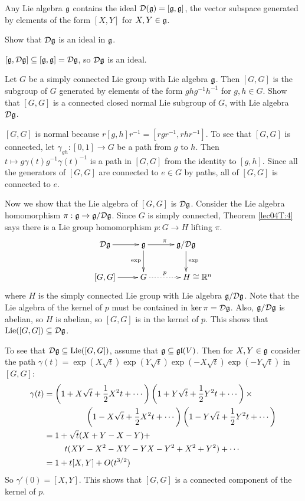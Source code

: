  Any Lie algebra $\mathfrak{g}$ contains the ideal $\mathcal{D}(\mathfrak{g}) = [\mathfrak{g},\mathfrak{g}]$, the vector subspace
 generated by elements of the form $[X,Y]$ for $X,Y\in \mathfrak{g}$.
 \begin{exercise}
   Show that $\mathcal{D}\mathfrak{g}$ is an ideal in $\mathfrak{g}$.
   \begin{solution}
     $[\mathfrak{g},\mathcal{D}\mathfrak{g}]\subseteq [\mathfrak{g},\mathfrak{g}] = \mathcal{D}\mathfrak{g}$, so $\mathcal{D}\mathfrak{g}$ is an ideal.
   \end{solution}
 \end{exercise}
 \begin{exercise} \label{lec11hardEx}
   Let $G$ be a simply connected Lie group with Lie algebra $\mathfrak{g}$. Then $[G,G]$ is the
   subgroup of $G$ generated by elements of the form $ghg^{-1}h^{-1}$ for $g,h\in G$.
   Show that $[G,G]$ is a connected closed normal Lie subgroup of $G$, with Lie
   algebra $\mathcal{D}\mathfrak{g}$.
  \begin{solution}
   $[G,G]$ is normal because $r[g,h]r^{-1}=[rgr^{-1},rhr^{-1}]$. To see
   that $[G,G]$ is connected, let $\gamma_{gh}:[0,1]\to G$ be a path from $g$ to $h$.
   Then $t\mapsto g\gamma(t)g^{-1}\gamma(t)^{-1}$ is a path in $[G,G]$ from
   the identity to $[g,h]$. Since all the generators of $[G,G]$ are connected
   to $e\in G$ by paths, all of $[G,G]$ is connected to $e$.

   Now we show that the Lie algebra of $[G,G]$ is $\mathcal{D}\mathfrak{g}$. Consider the Lie algebra
   homomorphism $\pi:\mathfrak{g}\to \mathfrak{g}/\mathcal{D}\mathfrak{g}$. Since $G$ is simply connected, Theorem
   \ref{lec04T:4} says there is a Lie group homomorphism $p:G\to H$ lifting $\pi$.
   \[\xymatrix{
    \D\g \ar[r] &\g \ar[r]^\pi \ar[d]_\exp & \g/\D\g\ar[d]^\exp\\
    [G,G]\ar[r] & G\ar@{.>}[r]^p & **[r] H\cong \RR^n
   }\]
   where $H$ is the simply connected Lie group with Lie algebra $\mathfrak{g}/\mathcal{D}\mathfrak{g}$. Note that
   the Lie algebra of the kernel of $p$ must be contained in $\ker \pi = \mathcal{D}\mathfrak{g}$. Also,
   $\mathfrak{g}/\mathcal{D}\mathfrak{g}$ is abelian, so $H$ is abelian, so $[G,G]$ is in the kernel of $p$. This
   shows that $\operatorname{Lie}([G,G])\subseteq \mathcal{D}\mathfrak{g}$.

   To see that $\mathcal{D}\mathfrak{g}\subseteq \operatorname{Lie}([G,G])$, assume that $\mathfrak{g}\subseteq \mathfrak{gl}(V)$. Then for
   $X,Y\in \mathfrak{g}$ consider the path $\gamma(t) =
   \exp(X\sqrt{t})\exp(Y\sqrt{t})\exp(-X\sqrt{t})\exp(-Y\sqrt{t})$ in $[G,G]$:
   \begin{align*}
     \gamma(t) &= \left(1+X\sqrt{t}+\frac{1}{2}X^2t+\cdots\right)
                 \left(1+Y\sqrt{t}+\frac{1}{2}Y^2t+\cdots\right) \times \\
               & \hspace{5em}
                 \left(1-X\sqrt{t}+\frac{1}{2}X^2t+\cdots\right)
                 \left(1-Y\sqrt{t}+\frac{1}{2}Y^2t+\cdots\right) \\
               &= 1+\sqrt{t}(X+Y-X-Y) + \\
               &\hspace{2.5em} t(XY-X^2-XY-YX -Y^2 +X^2+Y^2) +\cdots\\
               &=1+ t[X,Y] + O(t^{3/2})
   \end{align*}
   So $\gamma'(0)=[X,Y]$. This shows that $[G,G]$ is a connected component of the
   kernel of $p$.


\end{solution}
\end{exercise}
